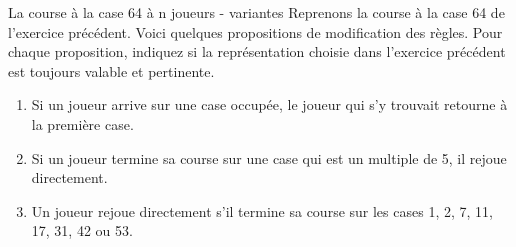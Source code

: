 \begin{Exercice}{La course à la case 64 à n joueurs - variantes}
	Reprenons la course à la case 64 de l'exercice précédent.
	Voici quelques propositions de modification des règles.
	Pour chaque proposition, indiquez si la représentation
	choisie dans l'exercice précédent est toujours valable et pertinente.
	\begin{enumerate}
	\item 
		Si un joueur arrive sur une case occupée, 
		le joueur qui s'y trouvait retourne à la première case.
	\item
		Si un joueur termine sa course sur une case qui est un multiple de 5,
		il rejoue directement.
	\item
		Un joueur rejoue directement s'il termine sa course
		sur les cases 1, 2, 7, 11, 17, 31, 42 ou 53.
	\end{enumerate}	
\end{Exercice}

